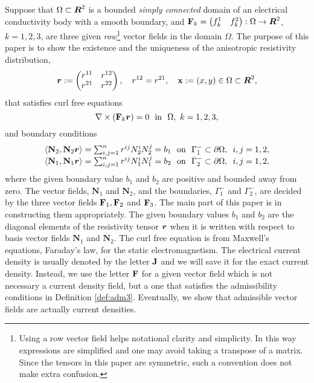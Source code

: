 \documentclass[11pt]{amsart}
\theoremstyle{plain}
\numberwithin{equation}{section}
\numberwithin{Thm}{section}
\def\R{\mbox{\boldmath$R$}}
\def\J{{\bf J}}
\def\N{{\mathbf N}}
\def\F{{\bf F}}
\def\r{{\bf r}}
\def\x{{\bf x}}
\def\r{\mbox{\boldmath$r$}}
\begin{document}
Suppose that $\Omega\subset\R^2$ is a bounded \emph{simply connected} domain of an electrical conductivity body with a smooth boundary, and $\F_k=\begin{pmatrix} f^1_k & f^2_k \end{pmatrix}:\Omega\to\R^2$, $k=1,2,3$, are three given \emph{row}\footnote{Using a row vector field helps notational clarity and simplicity. In this way expressions are simplified and one may avoid taking a transpose of a matrix. Since the tensors in this paper are symmetric, such a convention does not make extra confusion.} vector fields in the domain $\Omega$. The purpose of this paper is to show the existence and the uniqueness of the anisotropic resistivity distribution,
\begin{equation}\label{ortho}
\r:=\begin{pmatrix}r^{11}&r^{12} \\ r^{21}& r^{22}\end{pmatrix},\quad r^{12}=r^{21},\quad \x:=(x,y)\in\Omega\subset\R^2,
\end{equation}
that satisfies curl free equations
\begin{equation}\label{Faraday}
\nabla\times(\F_k\r )=0\ \ \mbox{in}\ \ \Omega,\ k=1,2,3,
\end{equation}
and boundary conditions
\begin{equation}\label{FaradayBC}
\begin{array}{l}
\left<\N_2, \N_2\r \right> = \sum_{i,j=1}^n r^{ij}N_2^i N_2^j=b_1\ \ \mbox{on}\ \ {\Gamma^-_1}\subset\partial\Omega,\ \, i,j=1,2,\\
\left<\N_1, \N_1\r \right> = \sum_{i,j=1}^n r^{ij}N_1^i N_1^j=b_2\ \ \mbox{on}\ \ {\Gamma^-_2}\subset\partial\Omega,\ \, i,j=1,2,\\
\end{array}
\end{equation}
where the given boundary value $b_1$ and $b_2$ are positive and bounded away from zero. The vector fields, $\N_1$ and $\N_2$, and the boundaries, $\Gamma_{1}^-$ and $\Gamma_{2}^-$, are decided by the three vector fields $\F_1,\F_2$ and $\F_3$. The main part of this paper is in constructing them appropriately. The given boundary values $b_1$ and $b_2$ are the diagonal elements of the resistivity tensor $\r$ when it is written with respect to basis vector fields $\N_1$ and $\N_2$. The curl free equation is from Maxwell's equations, Faraday's law, for the static electromagnetism. The electrical current density is usually denoted by the letter $\J$ and we will save it for the exact current density. Instead, we use the letter $\F$ for a given vector field which is not necessary a current density field, but a one that satisfies the admissibility conditions in Definition \ref{def:adm3}. Eventually, we show that admissible vector fields are actually current densities.
\end{document}
